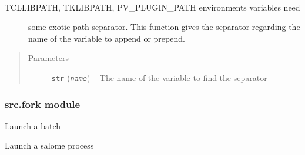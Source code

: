\documentclass[a4paper,10pt,english]{sphinxmanual}
\begin{document}
\begin{fulllineitems}
\label{commands/apidoc/src:src.fileEnviron.special_path_separator}~\begin{description}
\item[{TCLLIBPATH, TKLIBPATH, PV\_PLUGIN\_PATH environments variables need}] \leavevmode
some exotic path separator.
This function gives the separator regarding the name of the variable
to append or prepend.

\end{description}
\begin{quote}\begin{description}
\item[{Parameters}] \leavevmode
\textbf{\texttt{str}} (\emph{\texttt{name}}) -- The name of the variable to find the separator

\end{description}\end{quote}

\end{fulllineitems}



\subsubsection{src.fork module}
\label{commands/apidoc/src:module-src.fork}\label{commands/apidoc/src:src-fork-module}

\begin{fulllineitems}
\label{commands/apidoc/src:src.fork.batch}
Launch a batch

\end{fulllineitems}


\begin{fulllineitems}
\label{commands/apidoc/src:src.fork.batch_salome}
Launch a salome process

\end{fulllineitems}
\end{document}
